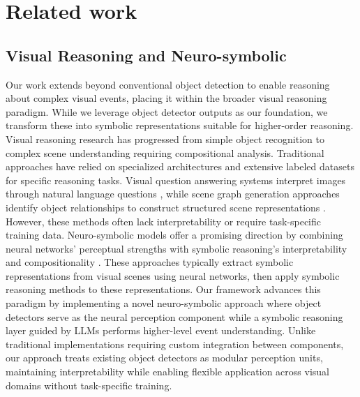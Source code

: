 \section{Related work}
\label{sec:related}
\subsection{Visual Reasoning and Neuro-symbolic}
Our work extends beyond conventional object detection to enable reasoning about complex visual events, placing it within the broader visual reasoning paradigm. While we leverage object detector outputs as our foundation, we transform these into symbolic representations suitable for higher-order reasoning.
Visual reasoning research has progressed from simple object recognition to complex scene understanding requiring compositional analysis. Traditional approaches have relied on specialized architectures and extensive labeled datasets for specific reasoning tasks. Visual question answering systems interpret images through natural language questions \cite{hudson2019gqa,chen2024spatialvlm,khan2024consistency,ganz2024question,majumdar2024openeqa,chen2024vtqa}, while scene graph generation approaches identify object relationships to construct structured scene representations \cite{krishna2017visual,li2024pixels, wang2025scene,lin2022ru,zareian2020bridging}. However, these methods often lack interpretability or require task-specific training data.
Neuro-symbolic models offer a promising direction by combining neural networks' perceptual strengths with symbolic reasoning's interpretability and compositionality \cite{garcez2019neural,amizadeh2020neuro,mao2019neuro,shi2019explainable,yi2018neural}. These approaches typically extract symbolic representations from visual scenes using neural networks, then apply symbolic reasoning methods to these representations. 
%
Our framework advances this paradigm by implementing a novel neuro-symbolic approach where object detectors serve as the neural perception component while a symbolic reasoning layer guided by LLMs performs higher-level event understanding. Unlike traditional implementations requiring custom integration between components, our approach treats existing object detectors as modular perception units, maintaining interpretability while enabling flexible application across visual domains without task-specific training.
%
